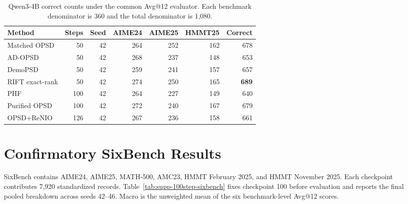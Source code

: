 \documentclass[10pt,letterpaper]{article}
\newcommand{\RIFT}{\textsc{RIFT}}
\newcommand{\best}[1]{\textbf{#1}}
\begin{document}
\begin{table}[H]
\centering
\small
\setlength{\tabcolsep}{5pt}
\begin{tabular}{lrrrrrr}
\toprule
Method & Steps & Seed & AIME24 & AIME25 & HMMT25 & Correct \\
\midrule
Matched OPSD & 50 & 42 & 264 & 252 & 162 & 678 \\
AD-OPSD & 50 & 42 & 268 & 237 & 148 & 653 \\
DemoPSD & 50 & 42 & 259 & 241 & 157 & 657 \\
\RIFT{} exact-rank & 50 & 42 & 274 & 250 & 165 & \best{689} \\
\midrule
PHF & 100 & 42 & 264 & 227 & 149 & 640 \\
Purified OPSD & 100 & 42 & 272 & 240 & 167 & 679 \\
OPSD+ReNIO & 126 & 42 & 267 & 236 & 158 & 661 \\
\bottomrule
\end{tabular}
\caption{Qwen3-4B correct counts under the common Avg@12 evaluator. Each
benchmark denominator is 360 and the total denominator is 1,080.}
\label{tab:supp-external-baselines}
\end{table}

\section{Confirmatory SixBench Results}

SixBench contains AIME24, AIME25, MATH-500, AMC23, HMMT February 2025, and
HMMT November 2025. Each checkpoint contributes 7,920 standardized records.
Table~\ref{tab:supp-100step-sixbench} fixes checkpoint 100 before evaluation
and reports the final pooled breakdown across seeds 42--46. Macro is the
unweighted mean of the six benchmark-level Avg@12 scores.
\end{document}
